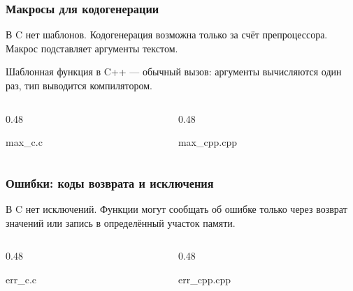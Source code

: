 \documentclass[compress, 8pt, aspectratio=169]{beamer}
\begin{document}
\begin{frame}[fragile]

    \frametitle{Макросы для кодогенерации}

    \begin{myitemize}

        \item В C нет шаблонов. Кодогенерация возможна
            только за счёт препроцессора.
            Макрос подставляет аргументы текстом.

        \item Шаблонная функция в C++ --- обычный вызов: аргументы
            вычисляются один раз, тип выводится компилятором.

    \end{myitemize}

    \begin{columns}[T]

        \begin{column}{0.48\textwidth}

                {max_c.c}

        \end{column}

        \begin{column}{0.48\textwidth}

                {max_cpp.cpp}

        \end{column}

    \end{columns}

\end{frame}

\begin{frame}[fragile]

    \frametitle{Ошибки: коды возврата и исключения}

    В C нет исключений. Функции могут сообщать об
    ошибке только через возврат значений или запись
    в определённый участок памяти.

    \begin{columns}[T]

        \begin{column}{0.48\textwidth}

                {err_c.c}

        \end{column}

        \begin{column}{0.48\textwidth}

                {err_cpp.cpp}

        \end{column}

    \end{columns}

\end{frame}
\end{document}
